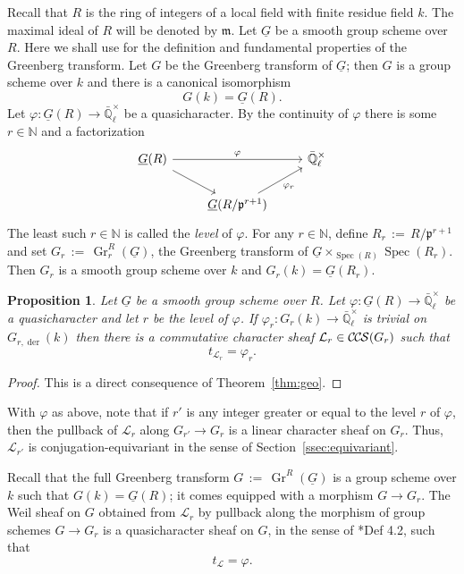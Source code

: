 \documentclass[10pt]{amsart}
\theoremstyle{plain}
\newtheorem{proposition}[theorem]{Proposition}
\theoremstyle{definition}
\newcommand{\NN}{{\mathbb{N}}}
\newcommand{\EE}{\mathbb{\bar Q}_\ell}
\newcommand{\Fq}{k}
\newcommand{\EEx}{\EE^\times}
\DeclareMathOperator{\Gr}{Gr}
\newcommand{\Spec}[1]{{\operatorname{Spec}(#1)}}
\newcommand{\ceq}{{\, :=\, }}
\newcommand{\trFrob}[1]{t_{#1}}
\newcommand{\cs}[1]{{\mathcal{#1}}}
\newcommand{\CCS}{{\mathcal{C\hskip-.8pt C\hskip-0.8pt S}}}
\begin{document}
Recall that $R$ is the ring of integers of a local field with finite residue field $k$.
The maximal ideal of $R$ will be denoted by $\mathfrak{m}$. 
Let $\underline{G}$ be a smooth group scheme over $R$.
Here we shall use  \cite{bertapelle-gonzales:Greenberg} for the definition and fundamental properties of the Greenberg transform.
Let $G$ be the Greenberg transform of $\underline{G}$; then $G$ is a group scheme over $\Fq$ and there is a canonical isomorphism
\[
G(\Fq) = \underline{G}(R).
\]
Let $\varphi : \underline{G}(R) \to \EEx$ be a quasicharacter. 
By the continuity of $\varphi$ there is some $r \in \NN$ and a factorization
\[
\begin{tikzcd}
\underline{G}(R) \arrow{rr}{\varphi} \arrow{rd} && \EEx\\
& \underline{G}(R/\mathfrak{p}^{r+1}) \arrow{ru}[swap]{\varphi_r} 
\end{tikzcd}
\] 
The least such $r\in \NN$ is called the {\it level} of $\varphi$.
For any $r\in \NN$, define $R_r \ceq R/\mathfrak{p}^{r+1}$ and
set $G_r \ceq \Gr_r^{R}(\underline{G})$, the Greenberg transform of $\underline{G}\times_{\Spec{R}}\Spec{R_r}$.
Then $G_r$ is a smooth group scheme over $\Fq$ and $G_r(\Fq) = \underline{G}(R_r)$.

\begin{proposition}\label{prop:quasicharacters}
Let $\underline{G}$ be a smooth group scheme over $R$.
Let $\varphi : \underline{G}(R) \to \EEx$ be a quasicharacter and let $r$ be the level of $\varphi$.
If $\varphi_r : G_r(k)\to \EEx$ is trivial on $G_{r,\operatorname{der}}(k)$ then 
there is a commutative character sheaf $\cs{L}_r\in \CCS(G_r)$ such that 
\[
\trFrob{\cs{L}_r} =  \varphi_r.
\] 
\end{proposition}

\begin{proof}
This is a direct consequence of Theorem~\ref{thm:geo}.
\end{proof}

With $\varphi$ as above, note that if $r'$ is any integer greater or equal to the level $r$ of $\varphi$, then the pullback of $\cs{L}_r$ along $G_{r'} \to G_{r}$ is a linear character sheaf on $G_r$. 
Thus, $\cs{L}_{r'}$ is conjugation-equivariant in the sense of Section~\ref{ssec:equivariant}.

Recall that the full Greenberg transform $G \ceq \Gr^{R}(\underline{G})$ is a group scheme over $\Fq$ such that $G(\Fq) = \underline{G}(R)$; it comes equipped with a morphism $G \to G_r$.
The Weil sheaf on $G$ obtained from $\cs{L}_r$ by pullback along the morphism of group schemes $G \to G_r$ is a quasicharacter sheaf on $G$, in the sense of \cite{cunningham-roe:13a}*{Def 4.2}, such that 
\[
\trFrob{\cs{L}} = \varphi.
\]
\end{document}
